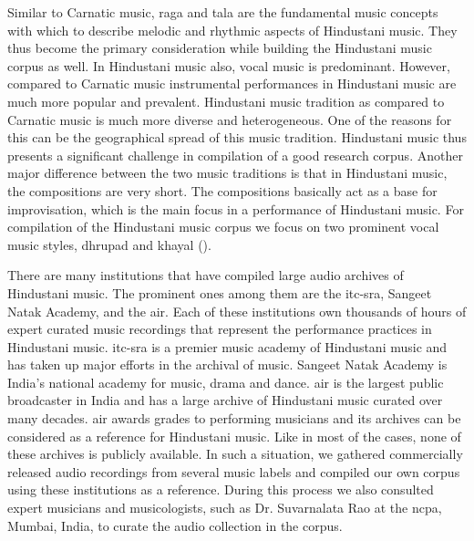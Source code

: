 Similar to Carnatic music, \gls{raga} and \gls{tala} are the fundamental music concepts with which to describe melodic and rhythmic aspects of Hindustani music. They thus become the primary consideration while building the Hindustani music corpus as well. In Hindustani music also, vocal music is predominant. However, compared to Carnatic music instrumental performances in Hindustani music are much more popular and prevalent. Hindustani music tradition as compared to Carnatic music is much more diverse and heterogeneous. One of the reasons for this can be the geographical spread of this music tradition. Hindustani music thus presents a significant challenge in compilation of a good research corpus. Another major difference between the two music traditions is that in Hindustani music, the compositions are very short. The compositions basically act as a base for improvisation, which is the main focus in a performance of Hindustani music. For compilation of the Hindustani music corpus we focus on two prominent vocal music styles, \gls{dhrupad} and \gls{khayal} (). %

There are many institutions that have compiled large audio archives of Hindustani music. The prominent ones among them are the \gls{itc-sra}, Sangeet Natak Academy, and the \gls{air}. Each of these institutions own thousands of hours of expert curated music recordings that represent the performance practices in Hindustani music. \gls{itc-sra} is a premier music academy of Hindustani music and has taken up major efforts in the archival of music. Sangeet Natak Academy is India’s national academy for music, drama and dance. \gls{air} is the largest public broadcaster in India and has a large archive of Hindustani music curated over many decades. \gls{air} awards grades to performing musicians and its archives can be considered as a reference for Hindustani music. Like in most of the cases, none of these archives is publicly available. In such a situation, we gathered commercially released audio recordings from several music labels and compiled our own corpus using these institutions as a reference. During this process we also consulted expert musicians and musicologists, such as Dr. Suvarnalata Rao at the \gls{ncpa}, Mumbai, India, to curate the audio collection in the corpus. 

